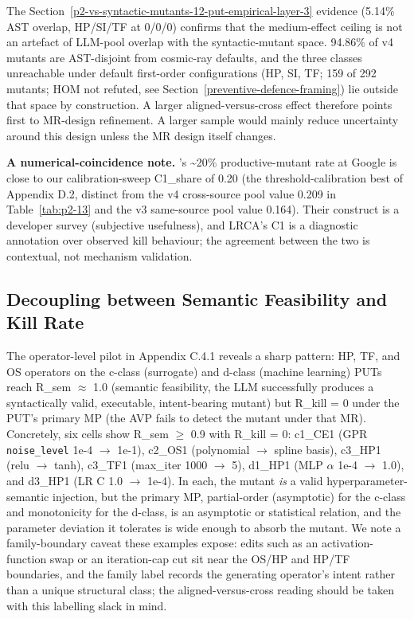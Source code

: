 \documentclass[manuscript,screen,review]{acmart}
\begin{document}
The Section~\ref{p2-vs-syntactic-mutants-12-put-empirical-layer-3} evidence (5.14\% AST overlap, HP/SI/TF at 0/0/0) confirms that
the medium-effect ceiling is not an artefact of LLM-pool overlap with
the syntactic-mutant space. 94.86\% of v4 mutants are AST-disjoint from
cosmic-ray defaults, and the three classes unreachable under default
first-order configurations (HP, SI, TF; 159 of 292 mutants; HOM not
refuted, see Section~\ref{preventive-defence-framing}) lie outside that space by construction. A
larger aligned-versus-cross effect therefore points first to MR-design
refinement. A larger sample would mainly reduce uncertainty around this
design unless the MR design itself changes.

\textbf{A numerical-coincidence note.} \citeauthor{petrovic2021improve}'s \citeyearpar{petrovic2021improve}
\textasciitilde20\% productive-mutant rate at Google is close to our
calibration-sweep C1\_share of 0.20 (the threshold-calibration best of
Appendix D.2, distinct from the v4 cross-source pool value 0.209 in
Table~\ref{tab:p2-13} and the v3 same-source pool value 0.164). Their
construct is a developer survey
(subjective usefulness), and LRCA's C1 is a diagnostic annotation over
observed kill behaviour; the agreement between the two is contextual,
not mechanism validation.

\subsection{Decoupling between Semantic Feasibility and Kill Rate}\label{decoupling-between-r_sem-and-r_kill}

The operator-level pilot in Appendix C.4.1 reveals a sharp pattern: HP,
TF, and OS operators on the c-class (surrogate) and d-class (machine
learning) PUTs reach R\_sem $\approx$ 1.0 (semantic feasibility, the LLM
successfully produces a syntactically valid, executable, intent-bearing
mutant) but R\_kill = 0 under the PUT's primary MP (the AVP fails to
detect the mutant under that MR). Concretely, six cells show R\_sem $\geq$
0.9 with R\_kill = 0: c1\_CE1 (GPR \texttt{noise\_level} 1e-4 $\to$ 1e-1),
c2\_OS1 (polynomial $\to$ spline basis), c3\_HP1 (relu $\to$ tanh), c3\_TF1
(max\_iter 1000 $\to$ 5), d1\_HP1 (MLP $\alpha$ 1e-4 $\to$ 1.0), and d3\_HP1 (LR C 1.0
$\to$ 1e-4). In each, the mutant \emph{is} a valid hyperparameter-semantic
injection, but the primary MP, partial-order (asymptotic) for the
c-class and
monotonicity for the d-class, is an asymptotic or statistical relation,
and the parameter deviation it tolerates is wide enough to absorb the
mutant. We note a family-boundary caveat these examples expose: edits
such as an activation-function swap or an iteration-cap cut sit near
the OS/HP and HP/TF boundaries, and the family label records the
generating operator's intent rather than a unique structural class;
the aligned-versus-cross reading should be taken with this labelling
slack in mind.
\end{document}
